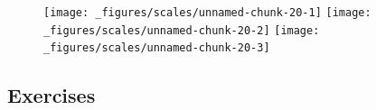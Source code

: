 \begin{Shaded}
\begin{Highlighting}[]
\StringTok{ }\NormalTok{(} \NormalTok{:}\NormalTok{)}
\StringTok{ }\NormalTok{)) +}\StringTok{ }\NormalTok{(}\NormalTok{(}  \NormalTok{)}
\StringTok{ }\NormalTok{(} \NormalTok{(}\NormalTok{, }\NormalTok{))}
\StringTok{ }\NormalTok{(} \NormalTok{(}\NormalTok{, }\NormalTok{), } 
\end{Highlighting}
\end{Shaded}

\begin{figure}[H]
  \centering
  \texttt{[image: \_figures/scales/unnamed-chunk-20-1]}%
  \texttt{[image: \_figures/scales/unnamed-chunk-20-2]}%
  \texttt{[image: \_figures/scales/unnamed-chunk-20-3]}
\end{figure}

\subsection{Exercises}\label{exercises-3}

